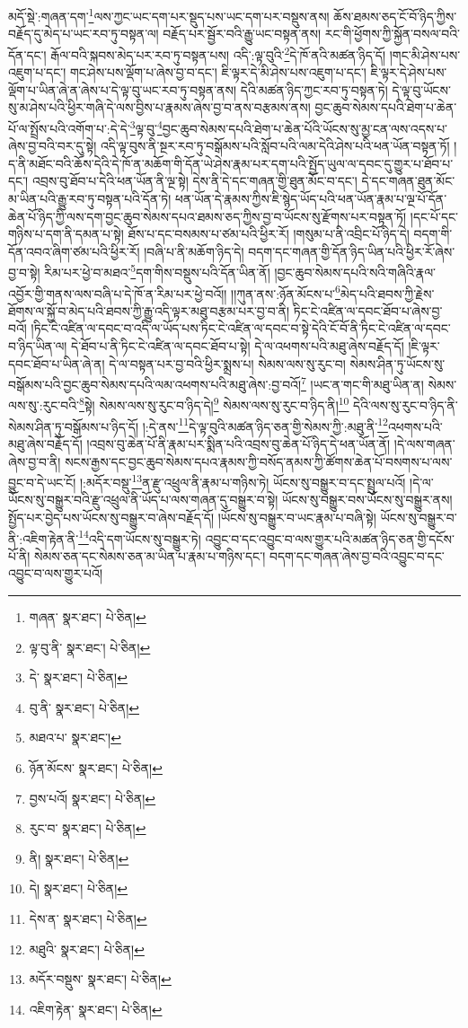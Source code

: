 མདོ་སྡེ་:གཞན་དག་\footnote{གཞན་  སྣར་ཐང་།  པེ་ཅིན། }ལས་ཀྱང་ཡང་དག་པར་སྡུད་པས་ཡང་དག་པར་བསྡུས་ནས། ཆོས་ཐམས་ཅད་ངོ་བོ་ཉིད་ཀྱིས་བརྗོད་དུ་མེད་པ་ཡང་རབ་ཏུ་བསྟན་ལ། བརྗོད་པར་སྦྱོར་བའི་རྒྱུ་ཡང་བསྟན་ནས། རང་གི་ཕྱོགས་ཀྱི་སྐྱོན་བསལ་བའི་དོན་དང་། རྒོལ་བའི་སྐབས་མེད་པར་རབ་ཏུ་བསྟན་པས། འདི་:ལྟ་བུའི་\footnote{ལྟ་བུ་ནི་  སྣར་ཐང་།  པེ་ཅིན། }དེ་ཁོ་ནའི་མཚན་ཉིད་དོ། །གང་མི་ཤེས་པས་འཇུག་པ་དང་། གང་ཤེས་པས་ལྡོག་པ་ཞེས་བྱ་བ་དང་། ཇི་ལྟར་དེ་མི་ཤེས་པས་འཇུག་པ་དང་། ཇི་ལྟར་དེ་ཤེས་པས་ལྡོག་པ་ཡིན་ཞེ་ན་ཞེས་པ་དེ་ལྟ་བུ་ཡང་རབ་ཏུ་བསྟན་ནས། དེའི་མཚན་ཉིད་ཀྱང་རབ་ཏུ་བསྟན་ཏེ། དེ་ལྟ་བུ་ཡོངས་སུ་མ་ཤེས་པའི་ཕྱིར་གཞི་དེ་ལས་བྱིས་པ་རྣམས་ཞེས་བྱ་བ་ནས་བརྩམས་ནས། བྱང་ཆུབ་སེམས་དཔའི་ཐེག་པ་ཆེན་པོ་ལ་སྤྲོས་པའི་འགོག་པ་:དེ་དེ་\footnote{དེ་  སྣར་ཐང་།  པེ་ཅིན། }ལྟ་བུ་\footnote{བུ་ནི་  སྣར་ཐང་།  པེ་ཅིན། }བྱང་ཆུབ་སེམས་དཔའི་ཐེག་པ་ཆེན་པོའི་ཡོངས་སུ་མྱ་ངན་ལས་འདས་པ་ཞེས་བྱ་བའི་བར་དུ་སྟེ། འདི་ལྟ་བུས་ནི་སྔར་རབ་ཏུ་བསྒོམས་པའི་སློབ་པའི་ལམ་དེའི་ཤེས་པའི་ཕན་ཡོན་བསྟན་ཏོ། །ད་ནི་མཐོང་བའི་ཆོས་དེའི་དེ་ཁོ་ན་མཆོག་གི་དོན་ཡེ་ཤེས་རྣམ་པར་དག་པའི་སྤྱོད་ཡུལ་ལ་དབང་དུ་གྱུར་པ་ཐོབ་པ་དང་། འབྲས་བུ་ཐོབ་པ་དེའི་ཕན་ཡོན་ནི་ལྔ་སྟེ། དེས་ནི་དེ་དང་གཞན་གྱི་ཐུན་མོང་བ་དང་། དེ་དང་གཞན་ཐུན་མོང་མ་ཡིན་པའི་རྒྱུ་རབ་ཏུ་བསྟན་པའི་དོན་ཏེ། ཕན་ཡོན་དེ་རྣམས་ཀྱིས་ཇི་སྙེད་ཡོད་པའི་ཕན་ཡོན་རྣམ་པ་ལྔ་པོ་དོན་ཆེན་པོ་ཉིད་ཀྱི་ལས་དག་བྱང་ཆུབ་སེམས་དཔའ་ཐམས་ཅད་ཀྱིས་བྱ་བ་ཡོངས་སུ་རྫོགས་པར་བསྟན་ཏོ། །དང་པོ་དང་གཉིས་པ་དག་ནི་དམན་པ་སྟེ། ཐོས་པ་དང་བསམས་པ་ཙམ་པའི་ཕྱིར་རོ། །གསུམ་པ་ནི་འབྲིང་པོ་ཉིད་དེ། བདག་གི་དོན་འབའ་ཞིག་ཙམ་པའི་ཕྱིར་རོ། །བཞི་པ་ནི་མཆོག་ཉིད་དེ། བདག་དང་གཞན་གྱི་དོན་ཉིད་ཡིན་པའི་ཕྱིར་རོ་ཞེས་བྱ་བ་སྟེ། རིམ་པར་ཕྱེ་བ་མཐའ་\footnote{མཐའ་པ་  སྣར་ཐང་། }དག་གིས་བསྡུས་པའི་དོན་ཡིན་ནོ། །བྱང་ཆུབ་སེམས་དཔའི་སའི་གཞིའི་རྣལ་འབྱོར་གྱི་གནས་ལས་བཞི་པ་དེ་ཁོ་ན་རིམ་པར་ཕྱེ་བའོ།། །།ཀུན་ནས་:ཉོན་མོངས་པ་\footnote{ཉོན་མོངས་  སྣར་ཐང་།  པེ་ཅིན། }མེད་པའི་ཐབས་ཀྱི་རྗེས་ཐོགས་ལ་སྐྱོ་བ་མེད་པའི་ཐབས་ཀྱི་རྒྱུ་འདི་ལྟར་མཐུ་བརྩམ་པར་བྱ་བ་ནི། ཏིང་ངེ་འཛིན་ལ་དབང་ཐོབ་པ་ཞེས་བྱ་བའོ། །ཏིང་ངེ་འཛིན་ལ་དབང་བ་འདི་ལ་ཡོད་པས་ཏིང་ངེ་འཛིན་ལ་དབང་བ་སྟེ་དེའི་ངོ་བོ་ནི་ཏིང་ངེ་འཛིན་ལ་དབང་བ་ཉིད་ཡིན་ལ། དེ་ཐོབ་པ་ནི་ཏིང་ངེ་འཛིན་ལ་དབང་ཐོབ་པ་སྟེ། དེ་ལ་འཕགས་པའི་མཐུ་ཞེས་བརྗོད་དོ། །ཇི་ལྟར་དབང་ཐོབ་པ་ཡིན་ཞེ་ན། དེ་ལ་བསྟན་པར་བྱ་བའི་ཕྱིར་སྨྲས་པ། སེམས་ལས་སུ་རུང་བ། སེམས་ཤིན་ཏུ་ཡོངས་སུ་བསྒོམས་པའི་བྱང་ཆུབ་སེམས་དཔའི་ལམ་འཕགས་པའི་མཐུ་ཞེས་:བྱ་བའོ།\footnote{བྱས་པའོ།  སྣར་ཐང་།  པེ་ཅིན། } །ཡང་ན་གང་གི་མཐུ་ཡིན་ན། སེམས་ལས་སུ་:རུང་བའི་\footnote{རུང་བ་  སྣར་ཐང་།  པེ་ཅིན། }སྟེ། སེམས་ལས་སུ་རུང་བ་ཉིད་དེ།\footnote{ནི།  སྣར་ཐང་།  པེ་ཅིན། } སེམས་ལས་སུ་རུང་བ་ཉིད་ནི།\footnote{དེ།  སྣར་ཐང་།  པེ་ཅིན། } དེའི་ལས་སུ་རུང་བ་ཉིད་ནི་སེམས་ཤིན་ཏུ་བསྒོམས་པ་ཉིད་དོ། །:དེ་ནས་\footnote{དེས་ན་  སྣར་ཐང་།  པེ་ཅིན། }དེ་ལྟ་བུའི་མཚན་ཉིད་ཅན་གྱི་སེམས་ཀྱི་:མཐུ་ནི་\footnote{མཐུའི་  སྣར་ཐང་།  པེ་ཅིན། }འཕགས་པའི་མཐུ་ཞེས་བརྗོད་དོ། །འབྲས་བུ་ཆེན་པོ་ནི་རྣམ་པར་སྨིན་པའི་འབྲས་བུ་ཆེན་པོ་ཉིད་དེ་ཕན་ཡོན་ནོ། །དེ་ལས་གཞན་ཞེས་བྱ་བ་ནི། སངས་རྒྱས་དང་བྱང་ཆུབ་སེམས་དཔའ་རྣམས་ཀྱི་བསོད་ནམས་ཀྱི་ཚོགས་ཆེན་པོ་བསགས་པ་ལས་བྱུང་བ་དེ་ཡང་ངོ། །:མདོར་བསྡུ་\footnote{མདོར་བསྡུས་  སྣར་ཐང་།  པེ་ཅིན། }ན་རྫུ་འཕྲུལ་ནི་རྣམ་པ་གཉིས་ཏེ། ཡོངས་སུ་བསྒྱུར་བ་དང་སྤྲུལ་པའོ། །དེ་ལ་ཡོངས་སུ་བསྒྱུར་བའི་རྫུ་འཕྲུལ་ནི་ཡོད་པ་ལས་གཞན་དུ་བསྒྱུར་བ་སྟེ། ཡོངས་སུ་བསྒྱུར་བས་ཡོངས་སུ་བསྒྱུར་ནས། སྤྱོད་པར་བྱེད་པས་ཡོངས་སུ་བསྒྱུར་བ་ཞེས་བརྗོད་དོ། །ཡོངས་སུ་བསྒྱུར་བ་ཡང་རྣམ་པ་བཞི་སྟེ། ཡོངས་སུ་བསྒྱུར་བ་ནི་:འཇིག་རྟེན་ནི་\footnote{འཇིག་རྟེན་  སྣར་ཐང་།  པེ་ཅིན། }འདི་དག་ཡོངས་སུ་བསྒྱུར་ཏེ། འབྱུང་བ་དང་འབྱུང་བ་ལས་གྱུར་པའི་མཚན་ཉིད་ཅན་གྱི་དངོས་པོ་ནི། སེམས་ཅན་དང་སེམས་ཅན་མ་ཡིན་པ་རྣམ་པ་གཉིས་དང་། བདག་དང་གཞན་ཞེས་བྱ་བའི་འབྱུང་བ་དང་འབྱུང་བ་ལས་གྱུར་པའོ། 